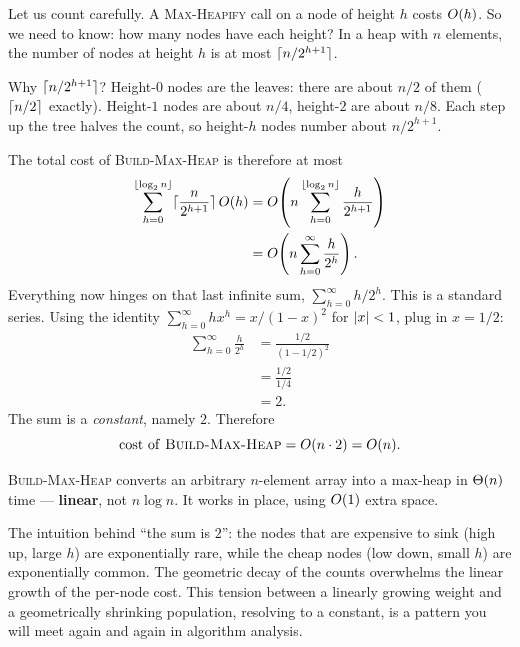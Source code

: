 Let us count carefully. A \textsc{Max-Heapify} call on a node of height $h$ costs
$O(h)$. So we need to know: how many nodes have each height? In a heap with $n$
elements, the number of nodes at height $h$ is at most $\lceil n/2^{h+1}\rceil$.

\begin{focusbox}
Why $\lceil n/2^{h+1}\rceil$? Height-$0$ nodes are the leaves: there are about $n/2$ of
them ($\lceil n/2\rceil$ exactly). Height-$1$ nodes are about $n/4$, height-$2$ are
about $n/8$. Each step up the tree halves the count, so height-$h$ nodes number
about $n/2^{h+1}$.
\end{focusbox}

The total cost of \textsc{Build-Max-Heap} is therefore at most
\begin{align*}
  \sum_{h=0}^{\lfloor\log_2 n\rfloor} \lceil\frac{n}{2^{h+1}}\rceil\, O(h)
  &= O\!\left( n \sum_{h=0}^{\lfloor\log_2 n\rfloor} \frac{h}{2^{h+1}} \right) \\
  &= O\!\left( n \sum_{h=0}^{\infty} \frac{h}{2^{h}} \right).
\end{align*}
Everything now hinges on that last infinite sum, $\sum_{h=0}^{\infty} h/2^{h}$.
This is a standard series. Using the identity $\sum_{h=0}^{\infty} h x^{h} = x/(1-x)^2$ for $\lvert x\rvert<1$, plug in $x = 1/2$:
\begin{align*}
  \sum_{h=0}^{\infty} \frac{h}{2^{h}}
  &= \frac{1/2}{(1 - 1/2)^2} \\
  &= \frac{1/2}{1/4} \\
  &= 2.
\end{align*}
The sum is a \emph{constant}, namely $2$. Therefore
\[
  \text{cost of \textsc{Build-Max-Heap}} = O\!\left(n \cdot 2\right) = O(n).
\]

\begin{complexitybox}
\textsc{Build-Max-Heap} converts an arbitrary $n$-element array into a max-heap
in $\Theta(n)$ time --- \textbf{linear}, not $n\log n$. It works in place, using
$O(1)$ extra space.
\end{complexitybox}

\begin{intuitionbox}
The intuition behind ``the sum is $2$'': the nodes that are expensive to
sink (high up, large $h$) are exponentially rare, while the cheap nodes (low
down, small $h$) are exponentially common. The geometric decay of the counts
overwhelms the linear growth of the per-node cost. This tension between a
linearly growing weight and a geometrically shrinking population, resolving to a
constant, is a pattern you will meet again and again in algorithm analysis.
\end{intuitionbox}

